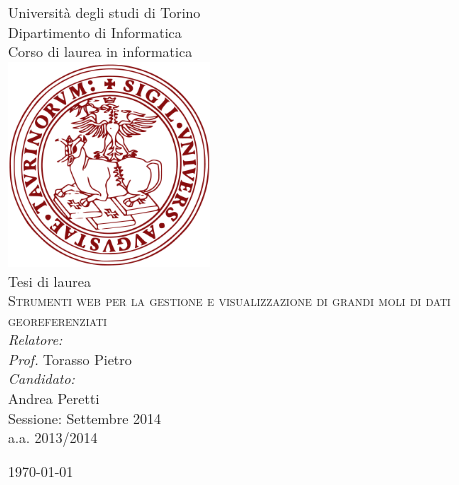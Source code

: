 \begin{titlepage}
\begin{center}

{\LARGE Università degli studi di Torino}\\
{Dipartimento di Informatica}\\[1cm]

{\Large Corso di laurea in informatica}\\[0.5cm]
\includegraphics[width=0.40\textwidth]{img/unitologo.png}~\\[0.5cm]

{Tesi di laurea}\\[1cm]
\textsc{\LARGE Strumenti web per la gestione e visualizzazione di grandi moli di dati georeferenziati}\\[1.5cm]


{\emph{Relatore:}}\\
{\emph{Prof.} Torasso Pietro}\\[1cm]

{\emph{Candidato:}}\\
{Andrea Peretti}\\[1.5cm]
{\Large Sessione: Settembre 2014}\\
{a.a. 2013/2014}




\vfill

{\large \today}

\end{center}
\end{titlepage}
